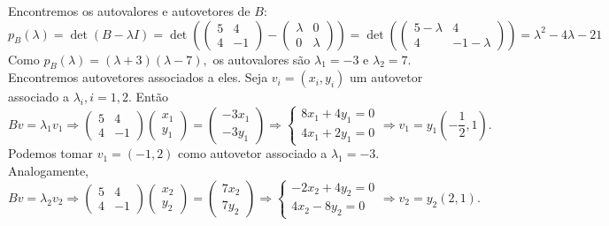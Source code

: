 \documentclass[11pt,a4paper]{article}
\begin{document}
{{\task[\pers{b}] Encontremos os autovalores e autovetores de $B:$
\[
p_B(\lambda) = \det(B - \lambda I) = \det \left( \begin{pmatrix}
5 & 4 \\
4 & -1
\end{pmatrix} - \begin{pmatrix}
\lambda & 0 \\
0 & \lambda
\end{pmatrix}  \right) = \det \left( \begin{pmatrix}
5-\lambda & 4 \\
4 & -1-\lambda
\end{pmatrix}  \right) = \lambda^2 - 4\lambda - 21
\]
Como $p_B(\lambda) = (\lambda + 3)(\lambda - 7),$ os autovalores são $\lambda_1 = -3$ e $\lambda_2 = 7.$ Encontremos autovetores associados a eles. Seja $v_i = (x_i,y_i)$ um autovetor associado a $\lambda_i, i =1,2.$ Então
\[
Bv=  \lambda_1 v_1 \Rightarrow \begin{pmatrix}
5 & 4 \\
4 & -1
\end{pmatrix} \begin{pmatrix}
x_1 \\ y_1
\end{pmatrix} =  \begin{pmatrix}
-3x_1 \\ -3y_1
\end{pmatrix} \Rightarrow \begin{cases}
8x_1+4y_1 = 0 \\
4x_1 + 2y_1 = 0
\end{cases} \Rightarrow v_1 = y_1 \left(-\frac{1}{2}, 1 \right).
\]
Podemos tomar $v_1 = (-1,2)$ como autovetor associado a $\lambda_1 = -3.$ Analogamente,
\[
Bv=  \lambda_2 v_2 \Rightarrow \begin{pmatrix}
5 & 4 \\
4 & -1
\end{pmatrix} \begin{pmatrix}
x_2 \\ y_2
\end{pmatrix} =  \begin{pmatrix}
7x_2 \\ 7y_2
\end{pmatrix} \Rightarrow \begin{cases}
-2x_2+4y_2 = 0 \\
4x_2 - 8y_2 = 0
\end{cases} \Rightarrow v_2 = y_2 \left(2, 1 \right).
\]

}}
\end{document}
